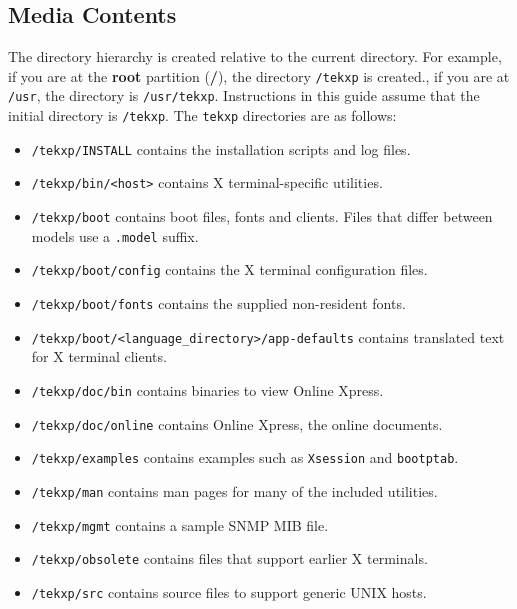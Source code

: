 \documentclass[11pt]{article}
\begin{document}
\subsection {Media Contents}

The directory hierarchy is created relative to the current directory. For
example, if you are at the {\bf root} partition ({\bf /}), the directory
{\tt /tekxp} is created., if you are at {\tt /usr}, the directory is
{\tt /usr/tekxp}.  Instructions in this guide assume that the initial directory
is {\tt /tekxp}. The {\tt tekxp} directories are as follows:

\begin {itemize}

\item {\tt /tekxp/INSTALL} contains the installation scripts and log files.

\item {\tt /tekxp/bin/<host>} contains X terminal-specific utilities.

\item {\tt /tekxp/boot} contains boot files, fonts and clients. Files that
differ between models use a {\tt .model} suffix.

\item {\tt /tekxp/boot/config} contains the X terminal configuration files.

\item {\tt /tekxp/boot/fonts} contains the supplied non-resident fonts.

\item {\tt /tekxp/boot/<language\_directory>/app-defaults} contains translated
text for X terminal clients.

\item {\tt /tekxp/doc/bin} contains binaries to view Online Xpress.

\item {\tt /tekxp/doc/online} contains Online Xpress, the online documents.

\item {\tt /tekxp/examples} contains examples such as {\tt Xsession} and
{\tt bootptab}.

\item {\tt /tekxp/man} contains man pages for many of the included utilities.

\item {\tt /tekxp/mgmt} contains a sample SNMP MIB file.

\item {\tt /tekxp/obsolete} contains files that support earlier X terminals.

\item {\tt /tekxp/src} contains source files to support generic UNIX hosts.

\end {itemize}
\end{document}
